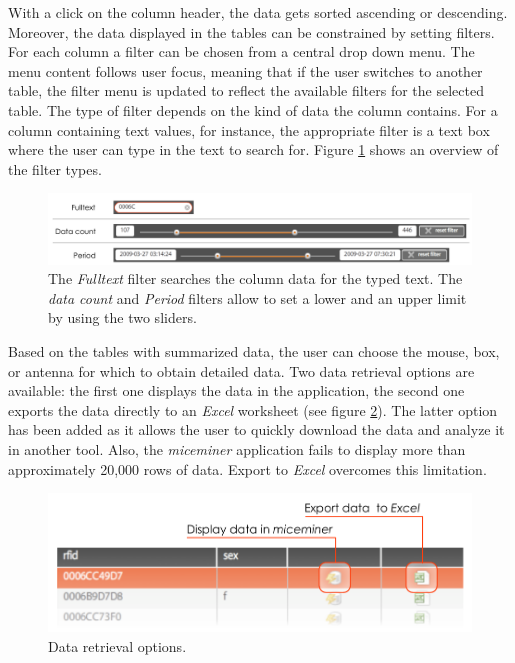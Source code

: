 With a click on the column header, the data gets sorted ascending or descending. Moreover, the data displayed in the tables can be constrained by setting filters. For each column a filter can be chosen from a central drop down menu. The menu content follows user focus, meaning that if the user switches to another table, the filter menu is updated to reflect the available filters for the selected table. The type of filter depends on the kind of data the column contains. For a column containing text values, for instance, the appropriate filter is a text box where the user can type in the text to search for. Figure \ref{fig:filter_types} shows an overview of the filter types.

\begin{figure}[ht]
\begin{center}
  \includegraphics[width=\textwidth]{assets/pdf/filter_types.pdf}
  \caption[Filter types]{The \textit{Fulltext} filter searches the column data for the typed text. The \textit{data count} and \textit{Period} filters allow to set a lower and an upper limit by using the two sliders.}
  \label{fig:filter_types}
\end{center}
\end{figure}

Based on the tables with summarized data, the user can choose the mouse, box, or antenna for which to obtain detailed data. Two data retrieval options are available: the first one displays the data in the application, the second one exports the data directly to an \textit{Excel} worksheet (see figure \ref{fig:get_data_options}). The latter option has been added as it allows the user to quickly download the data and analyze it in another tool. Also, the \textit{miceminer} application fails to display more than approximately 20,000 rows of data. Export to \textit{Excel} overcomes this limitation.   

\begin{figure}[htbp]
\begin{center}
  \includegraphics[width=.75\textwidth]{assets/pdf/get_data_options.pdf}
  \caption[Data retrieval options]{Data retrieval options.}
  \label{fig:get_data_options}
\end{center}
\end{figure}

